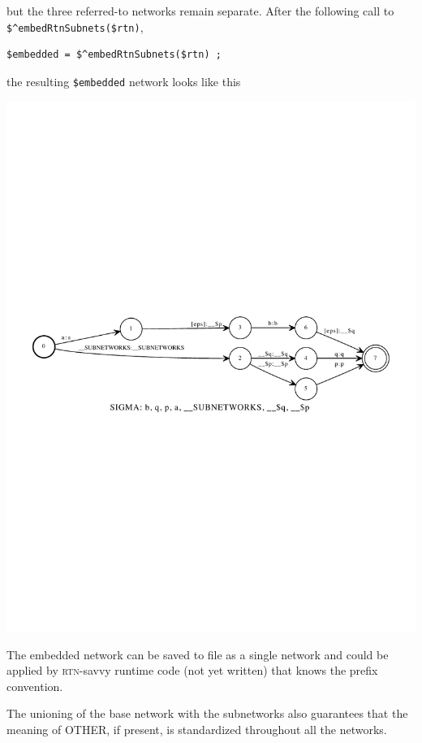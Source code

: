 \documentclass[letterpaper,12pt]{article}
\newcommand{\acro}{\textsc}
\begin{document}
\noindent
but the three referred-to networks remain separate.  After the following
call to \verb!$^embedRtnSubnets($rtn)!, 

\begin{Verbatim}[fontsize=\small]
$embedded = $^embedRtnSubnets($rtn) ;
\end{Verbatim}


\noindent
the resulting \verb!$embedded! network looks like this

\begin{center}
\includegraphics[width=\textwidth]{images/embedded.pdf}
\end{center}

\noindent
The embedded network can be saved to file as a single network and could be
applied by \acro{rtn}-savvy runtime code (not yet written) that knows the prefix convention.

The unioning of the base network with the subnetworks also guarantees that
the meaning of OTHER, if present, is standardized throughout all the
networks.
\end{document}

